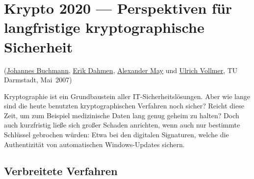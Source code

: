 
\begin{refsegment}

\newpage
\hypertarget{Chapter_Crypto2020}{}
\chapter{Krypto 2020 --- Perspektiven für langfristige kryptographische
         Sicherheit}
\label{Chapter_Crypto2020}
\begin{sloppypar}
(\hyperlink{author_Johannes-Buchmann}{Johannes Buchmann},
 \hyperlink{author_Erik-Dahmen}{Erik Dahmen},
 \hyperlink{author_Alexander-May}{Alexander May} und
 \hyperlink{author_Ulrich-Vollmer}{Ulrich Vollmer}, TU Darmstadt, Mai~2007)\\
\end{sloppypar}


Kryptographie ist ein Grundbaustein aller IT-Sicherheitslösungen.  Aber
wie lange sind die heute benutzten kryptographischen Verfahren noch
sicher? Reicht diese Zeit, um zum Beispiel medizinische Daten lang genug
geheim zu halten? Doch auch kurzfristig ließe sich großer Schaden
anrichten, wenn auch nur bestimmte Schlüssel gebrochen würden: Etwa bei
den digitalen Signaturen, welche die Authentizität von automatischen
Windows-Updates sichern.


\section{Verbreitete Verfahren}
\label{sec:verfahren}


\end{refsegment}
